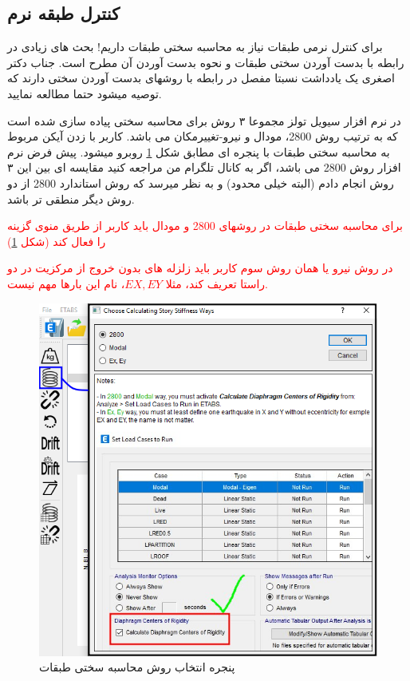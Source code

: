 \subsection{کنترل طبقه نرم}
برای کنترل نرمی طبقات نیاز به محاسبه سختی طبقات داریم! بحث های زیادی در رابطه با بدست آوردن سختی طبقات و نحوه بدست آوردن آن مطرح است. جناب دکتر اصغری یک یادداشت نسبتا مفصل در رابطه با روشهای بدست آوردن سختی دارند که توصیه میشود حتما مطالعه نمایید.

در نرم افزار سیویل تولز مجموعا ۳ روش برای محاسبه سختی پیاده سازی شده است که به ترتیب روش 2800، مودال و نیرو-تغییرمکان می باشد. کاربر با زدن آیکن مربوط به محاسبه سختی طبقات با پنجره ای مطابق شکل 
\ref{pic:stiffness_way_dialog}
روبرو میشود. پیش فرض نرم افزار روش 2800 می باشد، اگر به کانال تلگرام من مراجعه کنید مقایسه ای بین این ۳ روش انجام دادم (البته خیلی محدود) و به نظر میرسد که روش استاندارد 2800 از دو روش دیگر منطقی تر باشد.

\textcolor{red}{برای محاسبه سختی طبقات در روشهای 2800 و مودال باید کاربر از طریق منوی  گزینه  را فعال کند (شکل \ref{pic:stiffness_way_dialog}) }

\textcolor{red}{در روش نیرو یا همان روش سوم کاربر باید زلزله های بدون خروج از مرکزیت در دو راستا تعریف کند، مثلا $EX, EY$، نام این بارها مهم نیست.}

\begin{figure}[H]
    \centering
    \includegraphics[scale=0.7]{figures/stiffness_dialog}
    \caption{پنجره انتخاب روش محاسبه سختی طبقات}
    \label{pic:stiffness_way_dialog}
\end{figure}

